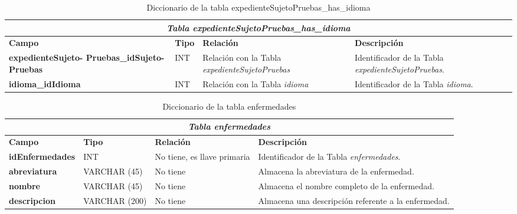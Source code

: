 \begin{table}[H]
\begin{center}
\begin{tabular}{||p{4cm}|p{}|p{}|p{5cm}||}
\hline
\multicolumn{4}{||c||}{\textit{\textbf{Tabla expedienteSujetoPruebas\_has\_idioma}}}\\
\hline 
\cellcolor{lightgray}\textbf{Campo} & \cellcolor{lightgray}\textbf{Tipo} & \cellcolor{lightgray}\textbf{Relación} & \cellcolor{lightgray}\textbf{Descripción} \\ \hline 
\textbf{expedienteSujeto- Pruebas\_idSujeto- Pruebas} & {INT} & {Relación con la Tabla \textit{expedienteSujetoPruebas}} & {Identificador de la Tabla \textit{expedienteSujetoPruebas}.} \\ \hline
\textbf{idioma\_idIdioma} & {INT} & {Relación con la Tabla \textit{idioma}} & {Identificador de la Tabla \textit{idioma}.} \\ \hline
\end{tabular}
\caption{Diccionario de la tabla expedienteSujetoPruebas\_has\_idioma}
\label{Tabla:expedienteSujetoPruebashasidioma}
\end{center}
\end{table}

\begin{table}[H]
\begin{center}
\begin{tabular}{||p{4cm}|p{}|p{}|p{5cm}||}
\hline
\multicolumn{4}{||c||}{\textit{\textbf{Tabla enfermedades}}}\\
\hline 
\cellcolor{lightgray}\textbf{Campo} & \cellcolor{lightgray}\textbf{Tipo} & \cellcolor{lightgray}\textbf{Relación} & \cellcolor{lightgray}\textbf{Descripción} \\ \hline 
\textbf{idEnfermedades} & {INT} & {No tiene, es llave primaria} & {Identificador de la Tabla \textit{enfermedades}.} \\ \hline
\textbf{abreviatura} & {VARCHAR (45)} & {No tiene} & {Almacena la abreviatura de la enfermedad.} \\ \hline
\textbf{nombre} & {VARCHAR (45)} & {No tiene} & {Almacena el nombre completo de la enfermedad.} \\ \hline
\textbf{descripcion} & {VARCHAR (200)} & {No tiene} & {Almacena una descripción referente a la enfermedad.} \\ \hline
\end{tabular}
\caption{Diccionario de la tabla enfermedades}
\label{Tabla:enfermedades}
\end{center}
\end{table}

